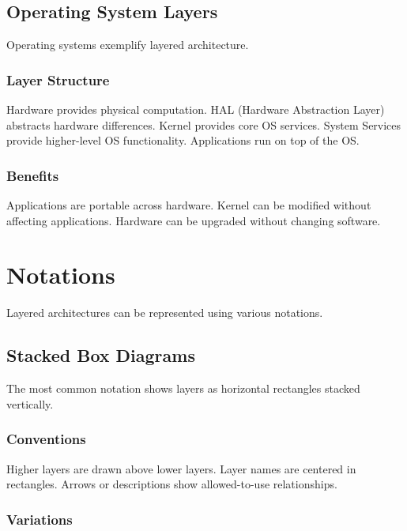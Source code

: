 \documentclass[11pt]{article}
\begin{document}
\subsection{Operating System Layers}

Operating systems exemplify layered architecture.

\subsubsection{Layer Structure}

Hardware provides physical computation. HAL (Hardware Abstraction Layer) abstracts hardware differences. Kernel provides core OS services. System Services provide higher-level OS functionality. Applications run on top of the OS.

\subsubsection{Benefits}

Applications are portable across hardware. Kernel can be modified without affecting applications. Hardware can be upgraded without changing software.

\section{Notations}

Layered architectures can be represented using various notations.

\subsection{Stacked Box Diagrams}

The most common notation shows layers as horizontal rectangles stacked vertically.

\subsubsection{Conventions}

Higher layers are drawn above lower layers. Layer names are centered in rectangles. Arrows or descriptions show allowed-to-use relationships.

\subsubsection{Variations}
\end{document}
